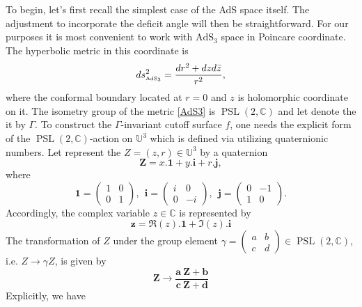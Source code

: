 \documentclass[a4paper,11pt]{article}
\newcommand{\PSLC}{\operatorname{PSL}(2,\mathbb{C})}
\begin{document}
To begin, let's first recall the simplest case of the AdS space itself. The adjustment to incorporate the deficit angle will then be straightforward. For our purposes it is most convenient to work with $\text{AdS}_3$ space in Poincare coordinate. The hyperbolic metric in this coordinate is 
\begin{equation}
	\begin{aligned}
		ds^2_{\text{\tiny AdS}_3} = \frac{dr^2 + dz d\bar{z}}{r^2},
	\end{aligned}\label{AdS3}
\end{equation}
where the conformal boundary located at $r=0$ and $z$ is holomorphic coordinate on it. The isometry group of the metric \eqref{AdS3} is $\PSLC$ and let denote the it by $\Gamma$. To construct the $\Gamma$-invariant cutoff surface $f$, one needs the explicit form of the $\PSLC$-action on $\mathbb{U}^3$ which is defined via utilizing quaternionic numbers. Let represent the $Z =(z,r) \in \mathbb{U}^3$ by a quaternion 
\begin{equation}
\mathbf{Z} = x.\mathbf{1} + y.\mathbf{i}+r.\mathbf{j},
\end{equation}
where 
\begin{equation}
\mathbf{1} = \begin{pmatrix}
1 & 0 \\
0 & 1 
\end{pmatrix},~~\mathbf{i} = \begin{pmatrix}
i & 0 \\
0 & -i 
\end{pmatrix},~~\mathbf{j} = \begin{pmatrix}
0 & -1 \\
1 & 0 
\end{pmatrix}.
\end{equation}
Accordingly, the complex variable $z\in \mathbb{C}$ is represented by
\begin{equation}
\mathbf{z} = \Re(z).\mathbf{1}+\Im(z).\mathbf{i} 
\end{equation}
The transformation of $Z$ under the group element $\gamma = \begin{pmatrix}
a & b \\
c & d 
\end{pmatrix}\in \PSLC$, i.e. $Z\rightarrow \gamma Z$, is given by
\begin{equation}
\mathbf{Z} \rightarrow  \frac{\mathbf{a}~\mathbf{Z} + \mathbf{b}}{\mathbf{c}~\mathbf{Z}+\mathbf{d}}
\end{equation}
Explicitly, we have
\end{document}

